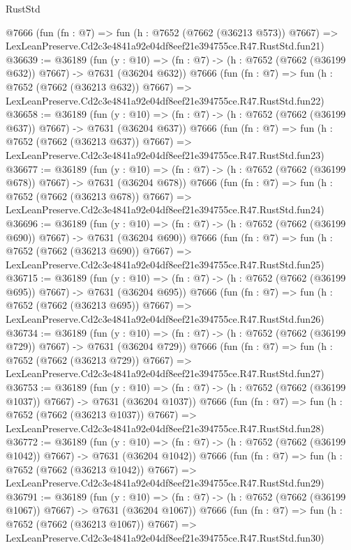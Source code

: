 \begin{lexlean}{RustStd}
\begin{coremodule}
    @7666
    (fun (fn : @7) =>
    fun (h : @7652 (@7662 (@36213 @573)) @7667) =>
    LexLeanPreserve.Cd2c3e4841a92e04df8eef21e394755ce.R47.RustStd.fun21)
@36639 := @36189
    (fun (y : @10) => (fn : @7) -> (h : @7652 (@7662 (@36199 @632)) @7667) -> @7631 (@36204 @632))
    @7666
    (fun (fn : @7) =>
    fun (h : @7652 (@7662 (@36213 @632)) @7667) =>
    LexLeanPreserve.Cd2c3e4841a92e04df8eef21e394755ce.R47.RustStd.fun22)
@36658 := @36189
    (fun (y : @10) => (fn : @7) -> (h : @7652 (@7662 (@36199 @637)) @7667) -> @7631 (@36204 @637))
    @7666
    (fun (fn : @7) =>
    fun (h : @7652 (@7662 (@36213 @637)) @7667) =>
    LexLeanPreserve.Cd2c3e4841a92e04df8eef21e394755ce.R47.RustStd.fun23)
@36677 := @36189
    (fun (y : @10) => (fn : @7) -> (h : @7652 (@7662 (@36199 @678)) @7667) -> @7631 (@36204 @678))
    @7666
    (fun (fn : @7) =>
    fun (h : @7652 (@7662 (@36213 @678)) @7667) =>
    LexLeanPreserve.Cd2c3e4841a92e04df8eef21e394755ce.R47.RustStd.fun24)
@36696 := @36189
    (fun (y : @10) => (fn : @7) -> (h : @7652 (@7662 (@36199 @690)) @7667) -> @7631 (@36204 @690))
    @7666
    (fun (fn : @7) =>
    fun (h : @7652 (@7662 (@36213 @690)) @7667) =>
    LexLeanPreserve.Cd2c3e4841a92e04df8eef21e394755ce.R47.RustStd.fun25)
@36715 := @36189
    (fun (y : @10) => (fn : @7) -> (h : @7652 (@7662 (@36199 @695)) @7667) -> @7631 (@36204 @695))
    @7666
    (fun (fn : @7) =>
    fun (h : @7652 (@7662 (@36213 @695)) @7667) =>
    LexLeanPreserve.Cd2c3e4841a92e04df8eef21e394755ce.R47.RustStd.fun26)
@36734 := @36189
    (fun (y : @10) => (fn : @7) -> (h : @7652 (@7662 (@36199 @729)) @7667) -> @7631 (@36204 @729))
    @7666
    (fun (fn : @7) =>
    fun (h : @7652 (@7662 (@36213 @729)) @7667) =>
    LexLeanPreserve.Cd2c3e4841a92e04df8eef21e394755ce.R47.RustStd.fun27)
@36753 := @36189
    (fun (y : @10) => (fn : @7) -> (h : @7652 (@7662 (@36199 @1037)) @7667) -> @7631 (@36204 @1037))
    @7666
    (fun (fn : @7) =>
    fun (h : @7652 (@7662 (@36213 @1037)) @7667) =>
    LexLeanPreserve.Cd2c3e4841a92e04df8eef21e394755ce.R47.RustStd.fun28)
@36772 := @36189
    (fun (y : @10) => (fn : @7) -> (h : @7652 (@7662 (@36199 @1042)) @7667) -> @7631 (@36204 @1042))
    @7666
    (fun (fn : @7) =>
    fun (h : @7652 (@7662 (@36213 @1042)) @7667) =>
    LexLeanPreserve.Cd2c3e4841a92e04df8eef21e394755ce.R47.RustStd.fun29)
@36791 := @36189
    (fun (y : @10) => (fn : @7) -> (h : @7652 (@7662 (@36199 @1067)) @7667) -> @7631 (@36204 @1067))
    @7666
    (fun (fn : @7) =>
    fun (h : @7652 (@7662 (@36213 @1067)) @7667) =>
    LexLeanPreserve.Cd2c3e4841a92e04df8eef21e394755ce.R47.RustStd.fun30)

\end{coremodule}
\end{lexlean}
